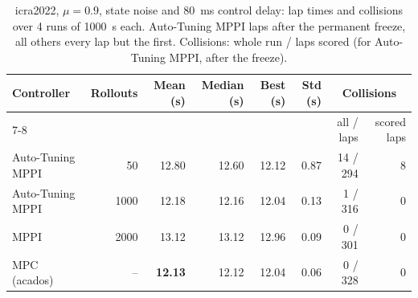 \begin{table}[t]
  \centering
  \caption{icra2022, $\mu=0.9$, state noise and \SI{80}{ms} control delay: lap times and collisions over 4 runs of \SI{1000}{s} each. Auto-Tuning MPPI laps after the permanent freeze, all others every lap but the first. Collisions: whole run / laps scored (for Auto-Tuning MPPI, after the freeze).}
  \label{tab:icra_comparison}
  \begin{tabular}{lrrrrrrr}
    \toprule
    Controller & Rollouts & Mean (s) & Median (s) & Best (s) & Std (s) & \multicolumn{2}{c}{Collisions} \\
    \cmidrule(lr){7-8}
    & & & & & & all / laps & scored laps \\
    \midrule
    Auto-Tuning MPPI & 50 & 12.80 & 12.60 & 12.12 & 0.87 & 14 / 294 & 8 \\
    Auto-Tuning MPPI & 1000 & 12.18 & 12.16 & 12.04 & 0.13 & 1 / 316 & 0 \\
    MPPI & 2000 & 13.12 & 13.12 & 12.96 & 0.09 & 0 / 301 & 0 \\
    MPC (acados) & -- & \textbf{12.13} & 12.12 & 12.04 & 0.06 & 0 / 328 & 0 \\
    \bottomrule
  \end{tabular}
\end{table}
